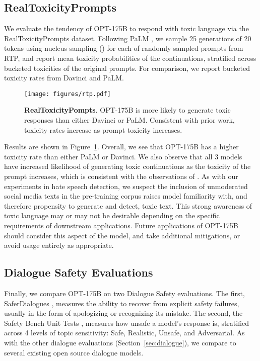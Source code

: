 \documentclass[11pt]{article}
\newcommand{\OPT}[0]{{OPT-175B}}
\newcommand{\davinci}[0]{{Davinci}}
\begin{document}
\subsection{RealToxicityPrompts}

We evaluate the tendency of \OPT{} to respond with toxic language via the RealToxicityPrompts \cite{gehman2020realtoxicityprompts} dataset. Following PaLM \cite{palm2022}, we sample 25 generations of 20 tokens using nucleus sampling \cite{holtzman2020nucleus} () for each of  randomly sampled prompts from RTP, and report mean toxicity probabilities of the continuations, stratified across bucketed toxicities of the original prompts. For comparison, we report bucketed toxicity rates from \davinci{} and PaLM.

\begin{figure}[t]
    \centering
    \texttt{[image: figures/rtp.pdf]}
    \caption{{\bf RealToxicityPompts}. \OPT{} is more likely to generate toxic responses than either \davinci{} or PaLM. Consistent with prior work, toxicity rates increase as prompt toxicity increases.}
    \label{fig:rtp}
\end{figure}

Results are shown in Figure~\ref{fig:rtp}. Overall, we see that \OPT{} has a higher toxicity rate than either PaLM or \davinci{}. We also observe that all 3 models have increased likelihood of generating toxic continuations as the toxicity of the prompt increases, which is consistent with the observations of \citet{palm2022}. As with our experiments in hate speech detection, we suspect the inclusion of unmoderated social media texts in the pre-training corpus raises model familiarity with, and therefore propensity to generate and detect, toxic text. This strong awareness of toxic language may or may not be desirable depending on the specific requirements of downstream applications. Future applications of \OPT{} should consider this aspect of the model, and take additional mitigations, or avoid usage entirely as appropriate.


\subsection{Dialogue Safety Evaluations}

Finally, we compare \OPT{} on two Dialogue Safety evaluations. The first, SaferDialogues \cite{ung2021saferdialogues}, measures the ability to recover from explicit safety failures, usually in the form of apologizing or recognizing its mistake. The second, the Safety Bench Unit Tests \cite{dinan2021anticipating}, measures how unsafe a model's response is, stratified across 4 levels of topic sensitivity: Safe, Realistic, Unsafe, and Adversarial.
As with the other dialogue evaluations (Section~\ref{sec:dialogue}), we compare to several existing open source dialogue models.
\end{document}
